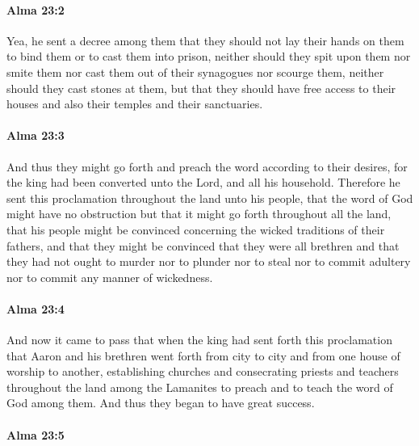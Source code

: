 		\paragraph{Alma 23:2} %
			\label{ALMA-23-2}

			Yea, he sent a decree among them
			that they should not lay their hands on them
			to bind them or to cast them into prison,
			neither should they spit upon them nor smite them
			nor cast them out of their synagogues nor scourge them,
			neither should they cast stones at them,
			but that they should have free access to their houses
			and also their temples and their sanctuaries.

		\paragraph{Alma 23:3} %
			\label{ALMA-23-3}

			And thus they might go forth and preach the word according to their desires,
			for the king had been converted unto the Lord, and all his household.
			Therefore he sent this proclamation throughout the land unto his people,
			that the word of God might have no obstruction
			but that it might go forth throughout all the land,
			that his people might be convinced
			concerning the wicked traditions of their fathers,
			and that they might be convinced that they were all brethren
			and that they had not ought to murder nor to plunder nor to steal
			nor to commit adultery nor to commit any manner of wickedness.

		\paragraph{Alma 23:4} %
			\label{ALMA-23-4}

			And now it came to pass that when the king had sent forth this proclamation
			that Aaron and his brethren went forth from city to city
			and from one house of worship to another,
			establishing churches and consecrating priests and teachers
			throughout the land among the Lamanites
			to preach and to teach the word of God among them.
			And thus they began to have great success.

		\paragraph{Alma 23:5} %
			\label{ALMA-23-5}

